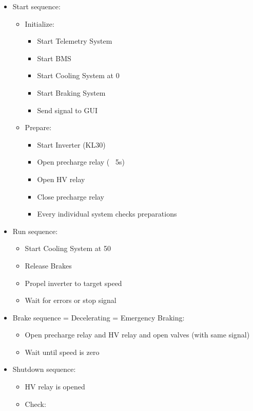 \begin{itemize}
    \item Start sequence:
    \begin{itemize}
        \item Initialize:
        \begin{itemize}
            \item Start Telemetry System
            \item Start BMS
            \item Start Cooling System at 0%
            \item Start Braking System
            \item Send signal to GUI
        \end{itemize}
        \item Prepare:
        \begin{itemize}
            \item Start Inverter (KL30)
            \item Open precharge relay (~ 5s)
            \item Open HV relay
            \item Close precharge relay
            \item Every individual system checks preparations
        \end{itemize}
    \end{itemize}
    \item Run sequence:
    \begin{itemize}
        \item Start Cooling System at 50%
        \item Release Brakes
        \item Propel inverter to target speed
        \item Wait for errors or stop signal
    \end{itemize}
    \item Brake sequence = Decelerating = Emergency Braking:
    \begin{itemize}
        \item Open precharge relay and HV relay and open valves (with same signal)
        \item Wait until speed is zero
    \end{itemize}
    \item Shutdown sequence:
    \begin{itemize}
        \item HV relay is opened
        \item Check:

\end{itemize}
\end{itemize}
